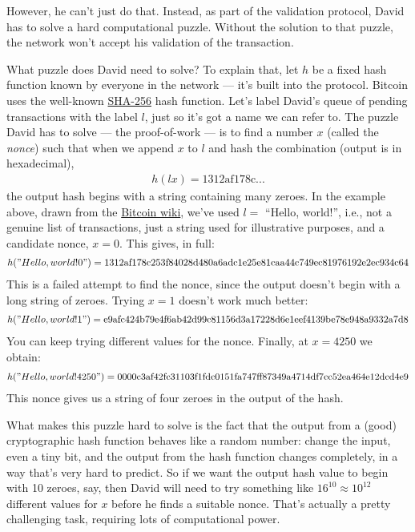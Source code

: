 \documentclass[12pt]{book}
\newcommand{\link}[2]{\href{#1}{#2}}
\newcounter{example}[chapter]
\begin{document}
However, he can't just do that.  Instead, as part of the validation
protocol, David has to solve a hard computational puzzle.  Without the
solution to that puzzle, the network won't accept his validation of
the transaction.  

What puzzle does David need to solve?  To explain that, let $h$ be a
fixed hash function known by everyone in the network --- it's built
into the protocol.  Bitcoin uses the well-known
\link{https://en.wikipedia.org/wiki/SHA-2}{SHA-256} hash function.
Let's label David's queue of pending transactions with the label $l$,
just so it's got a name we can refer to.  The puzzle David has to
solve --- the proof-of-work --- is to find a number $x$ (called the
\emph{nonce}) such that when we append $x$ to $l$ and hash the
combination (output is in hexadecimal),
\begin{eqnarray}
  h(lx) = \mbox{1312af178c...}
\end{eqnarray}
the output hash begins with a string containing many zeroes.  In the
example above, drawn from the
\link{https://en.bitcoin.it/wiki/Proof_of_work}{Bitcoin wiki}, we've
used $l = $ ``Hello, world!'', i.e., not a genuine list of
transactions, just a string used for illustrative purposes, and a
candidate nonce, $x = 0$.  This gives, in full:
\begin{eqnarray}
  h("Hello, world!0") = 
  \mbox{1312af178c253f84028d480a6adc1e25e81caa44c749ec81976192e2ec934c64}
\end{eqnarray}
This is a failed attempt to find the nonce, since the output doesn't
begin with a long string of zeroes.  Trying $x = 1$ doesn't work much
better:
\begin{eqnarray}
h("Hello, world!1") = \mbox{e9afc424b79e4f6ab42d99c81156d3a17228d6e1eef4139be78e948a9332a7d8}
\end{eqnarray}
You can keep trying different values for the nonce.  Finally, at $x =
4250$ we obtain:
\begin{eqnarray}
  h("Hello, world!4250") = \mbox{0000c3af42fc31103f1fdc0151fa747ff87349a4714df7cc52ea464e12dcd4e9}
\end{eqnarray}
This nonce gives us a string of four zeroes in the output of the hash.

What makes this puzzle hard to solve is the fact that the output from
a (good) cryptographic hash function behaves like a random number:
change the input, even a tiny bit, and the output from the hash
function changes completely, in a way that's very hard to predict.  So
if we want the output hash value to begin with 10 zeroes, say, then
David will need to try something like $16^{10} \approx 10^{12}$
different values for $x$ before he finds a suitable nonce.  That's
actually a pretty challenging task, requiring lots of computational
power.
\end{document}

